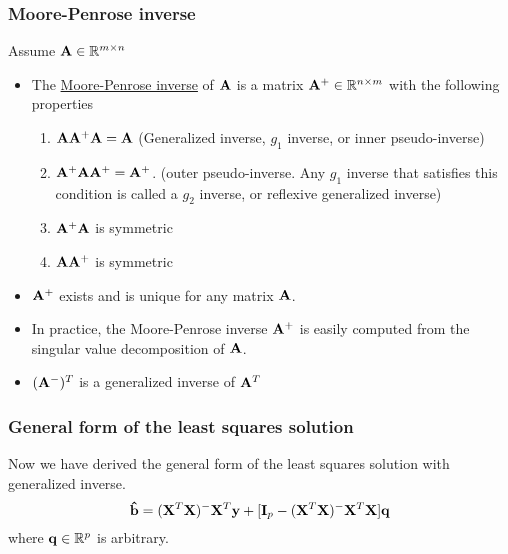 \subsubsection*{Moore-Penrose inverse}
Assume $\mathbf{A} \in \mathbb{R}^{m \times n}$
\begin{itemize}
	\item The \underline{Moore-Penrose inverse} of $\mathbf{A}$ is a matrix $\mathbf{A}^+ \in \mathbb{R}^{n \times m}$ with the following properties
	\begin{enumerate}
		\item $\mathbf{AA^+A = A}$ (Generalized inverse, $g_1$ inverse, or inner pseudo-inverse)
		\item $\mathbf{A^+ A A^+ = A^+}$. (outer pseudo-inverse.  Any $g_1$ inverse that satisfies this condition is called a $g_2$ inverse, or reflexive generalized inverse)
		\item $\mathbf{A^+ A}$ is symmetric
		\item $\mathbf{A A^+}$ is symmetric
	\end{enumerate}
	\item $\mathbf{A^+}$ exists and is unique for any matrix $\mathbf{A}$.
	\item In practice, the Moore-Penrose inverse $\mathbf{A}^+$ is easily computed from the singular value decomposition of $\mathbf{A}$.
	\item $(\mathbf{A^-})^T$ is a generalized inverse of $\mathbf{A}^T$
\end{itemize}

\subsubsection*{General form of the least squares solution}
Now we have derived the general form of the least squares solution with generalized inverse.
$$
\mathbf{\hat{b}} = (\mathbf{X}^T\mathbf{X})^-\mathbf{X}^T \mathbf{y} + [\mathbf{I}_p -  (\mathbf{X}^T\mathbf{X})^-\mathbf{X}^T\mathbf{X}]\mathbf{q}
$$
where $\mathbf{q}\in \mathbb{R}^p$ is arbitrary.



